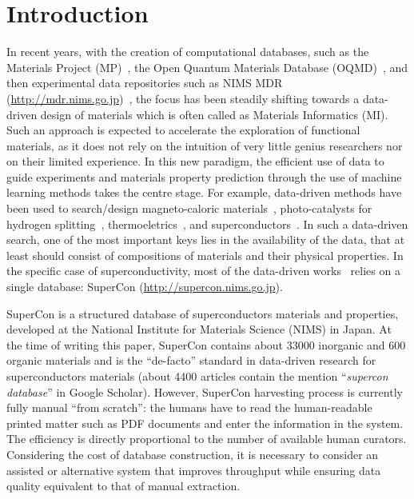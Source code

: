 \documentclass[]{interact}
\theoremstyle{plain}%
\theoremstyle{definition}
\theoremstyle{remark}
\begin{document}
\section{Introduction}
In recent years, with the creation of computational databases, such as the Materials Project (MP)~\cite{materialsprojectJain2013}, the Open Quantum Materials Database (OQMD)~\cite{oqmdkirklin2015open}, and then experimental data repositories such as NIMS MDR (\url{http://mdr.nims.go.jp})~\cite{ranganathan_anusha_2019_3553963}, the focus has been steadily shifting towards a data-driven design of materials which is often called as Materials Informatics (MI). 
Such an approach is expected to accelerate the exploration of functional materials, as it does not rely on the intuition of very little genius researchers nor on their limited experience.
In this new paradigm, the efficient use of data to guide experiments and materials property prediction through the use of machine learning methods takes the centre stage. 
For example, data-driven methods have been used to search/design magneto-caloric materials~\cite{Bocarsly2017,Castro2020-12,court2021inverse}, photo-catalysts for hydrogen splitting~\cite{xiong2021optimizing}, thermoeletrics~\cite{iwasaki2019machine}, and superconductors~\cite{stanev_machine_2017}. 
In such a data-driven search, one of the most important keys lies in the availability of the data, that at least should consist of compositions of materials and their physical properties. 
In the specific case of superconductivity, most of the data-driven works~\cite{stanev_machine_2017, le2020critical,Hamlin2019SuperconductivityNR} relies on a single database: SuperCon (\url{http://supercon.nims.go.jp}). 

SuperCon is a structured database of superconductors materials and properties, developed at the National Institute for Materials Science (NIMS) in Japan. 
At the time of writing this paper, SuperCon contains about 33000 inorganic and 600 organic materials and is the ``de-facto'' standard in data-driven research for superconductors materials  (about 4400 articles contain the mention ``\textit{supercon database}'' in Google Scholar). 
However, SuperCon harvesting process is currently fully manual ``from scratch'': the humans have to read the human-readable printed matter such as PDF documents and enter the information in the system. 
The efficiency is directly proportional to the number of available human curators.
Considering the cost of database construction, it is necessary to consider an assisted or alternative system that improves throughput while ensuring data quality equivalent to that of manual extraction.
\end{document}
